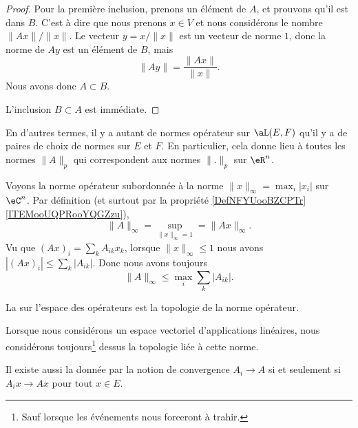 \begin{proof}
    Pour la première inclusion, prenons un élément de \( A\), et prouvons qu'il est dans \( B\). C'est à dire que nous prenons \( x\in V\) et nous considérons le nombre \( \| Ax \|/\| x \|\). Le vecteur \( y=x/\| x \|\) est un vecteur de norme $1$, donc la norme de \( Ay\) est un élément de \( B\), mais
    \begin{equation}
        \| Ay \|=\frac{ \| Ax \| }{ \| x \| }.
    \end{equation}
    Nous avons donc \( A\subset B\).

    L'inclusion \( B\subset A\) est immédiate.
\end{proof}

En d'autres termes, il y a autant de normes opérateur sur \( \aL(E,F)\) qu'il y a de paires de choix de normes sur \( E\) et \( F\). En particulier, cela donne lieu à toutes les normes \( \| A \|_p\) qui correspondent aux normes \( \| . \|_p\) sur \( \eR^n\). 

\begin{example}     \label{EXooXPXAooYyBwMX}
    Voyons la norme opérateur subordonnée à la norme \( \| x \|_{\infty}=\max_i| x_i |\) sur \( \eC^n\). Par définition (et surtout par la propriété \ref{DefNFYUooBZCPTr}\ref{ITEMooUQPRooYQGZzu}),
    \begin{equation}
        \| A \|_{\infty}=\sup_{\| x \|_{\infty}=1}=\| Ax \|_{\infty}.
    \end{equation}
    Vu que \( (Ax)_i=\sum_kA_{ik}x_k\), lorsque \( \| x \|_{\infty}\leq 1\) nous avons \( | (Ax)_i |\leq \sum_k| A_{ik} |\). Donc nous avons toujours
    \begin{equation}        \label{EQooPLCIooVghasD}
        \| A \|_{\infty}\leq \max_i\sum_{k}| A_{ik} |.
    \end{equation}
\end{example}

\begin{definition}
    La  sur l'espace des opérateurs est la topologie de la norme opérateur.  
\end{definition}
Lorsque nous considérons un espace vectoriel d'applications linéaires, nous considérons toujours\footnote{Sauf lorsque les événements nous forceront à trahir.} dessus la topologie liée à cette norme. 

Il existe aussi la  donnée par la notion de convergence \( A_i\to A\) si et seulement si \( A_ix\to Ax\) pour tout \( x\in E\).

